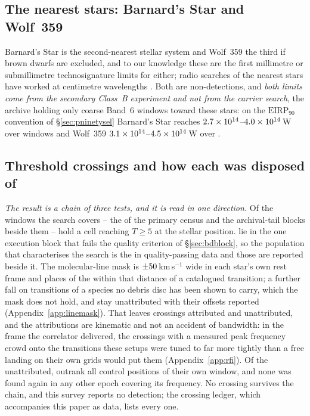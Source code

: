 \subsection{The nearest stars: Barnard's Star and Wolf~359}
\label{sec:barnardswolf}

Barnard's Star is the second-nearest stellar system and Wolf~359 the third if
brown dwarfs are excluded, and to our knowledge these are the first millimetre
or submillimetre technosignature limits for either; radio searches of the
nearest stars have worked at centimetre wavelengths
\citep{Enriquez2017,Price2020,Margot2023}. Both are non-detections, and
\emph{both limits come from the secondary Class~B experiment and not from the
carrier search}, the archive holding only coarse Band~6 windows toward these
stars: on the $\mathrm{EIRP}_{90}$ convention of \S\ref{sec:pninetysel}
Barnard's Star reaches $2.7\times10^{14}$--$4.0\times10^{14}$\,W over
\NWinBarn{} windows and Wolf~359 $3.1\times10^{14}$--$4.5\times10^{14}$\,W
over \NWinWolf.

\subsection{Threshold crossings and how each was disposed of}
\label{sec:technosearch}

\emph{The result is a chain of three tests, and it is read in one direction.}
Of the windows the search covers -- the \NWindows{} of the primary census and
the archival-tail blocks beside them -- \EvNCrossRaw{} hold a cell reaching
$T\geq5$ at the stellar position. \EvNCrossFlag{} lie in the one execution
block that fails the quality criterion of \S\ref{sec:bdblock}, so the
population that characterises the search is the \EvNCrossQp{} in
quality-passing data and those \EvNCrossFlag{} are reported beside it. The
molecular-line mask is $\pm50$\,km\,s$^{-1}$ wide in each star's own
rest frame and places \MkNCoinc{} of the \EvNCrossQp{} within that distance of
a catalogued transition; a further \SoNCrossWord{} fall on transitions of a
species no debris disc has been shown to carry, which the mask does not hold,
and stay unattributed with their offsets reported
(Appendix~\ref{app:linemask}). That leaves \EvNAttrQp{} crossings attributed
and \EvNUnattrQp{} unattributed, and the attributions are kinematic and not an
accident of bandwidth: in the frame the correlator delivered, the crossings
with a measured peak frequency crowd onto the transitions these setups were
tuned to far more tightly than a free landing on their own grids would put them
(Appendix~\ref{app:rfi}). Of the unattributed, \EvNRankQp{} outrank all
\NCtrl{} control positions of their own window, and none was found again in any
other epoch covering its frequency. No crossing survives the chain, and this
survey reports no detection; the crossing ledger, which accompanies this paper
as data, lists every one.

